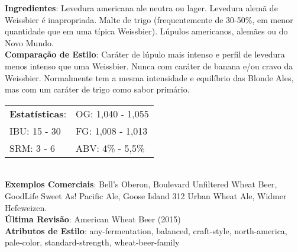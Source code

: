 \textbf{Ingredientes}: Levedura americana ale neutra ou lager. Levedura alemã de Weissbier é inapropriada. Malte de trigo (frequentemente de 30-50\%, em menor quantidade que em uma típica Weissbier). Lúpulos americanos, alemães ou do Novo Mundo. \\
\textbf{Comparação de Estilo}: Caráter de lúpulo mais intenso e perfil de levedura menos intenso que uma Weissbier. Nunca com caráter de banana e/ou cravo da Weissbier. Normalmente tem a mesma intensidade e equilíbrio das Blonde Ales, mas com um caráter de trigo como sabor primário. \\
\begin{tabular}{@{}p{35mm}p{35mm}@{}}
  \textbf{Estatísticas}: & OG: 1,040 - 1,055 \\
  IBU: 15 - 30  & FG: 1,008 - 1,013 \\
  SRM: 3 - 6  & ABV: 4\% - 5,5\%
\end{tabular}\\
\textbf{Exemplos Comerciais}: Bell’s Oberon, Boulevard Unfiltered Wheat Beer, GoodLife Sweet As! Pacific Ale, Goose Island 312 Urban Wheat Ale, Widmer Hefeweizen. \\
\textbf{Última Revisão}: American Wheat Beer (2015) \\
\textbf{Atributos de Estilo}: any-fermentation, balanced, craft-style, north-america, pale-color, standard-strength, wheat-beer-family
